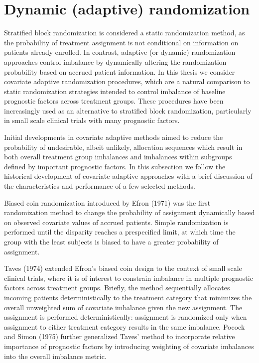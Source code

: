 \section{Dynamic (adaptive) randomization}
Stratified block randomization is considered a static randomization method, as the probability of treatment assignment is not conditional on information on patients already enrolled.  
In contrast, adaptive (or dynamic) randomization approaches control imbalance by dynamically altering the randomization probability based on accrued patient information.  
In this thesis we consider covariate adaptive randomization procedures, which are a natural comparison to static randomization strategies intended to control imbalance of baseline prognostic factors across treatment groups.  
These procedures have been increasingly used as an alternative to stratified block randomization, particularly in small scale clinical trials with many prognostic factors.

Initial developments in covariate adaptive methods aimed to reduce the probability of undesirable, albeit unlikely, allocation sequences which result in both overall treatment group imbalances and imbalances within subgroups defined by important prognostic factors.  
In this subsection we follow the historical development of covariate adaptive approaches with a brief discussion of the characteristics and performance of a few selected methods.

Biased coin randomization introduced by Efron (1971) was the first randomization method to change the probability of assignment dynamically based on observed covariate values of accrued patients. 
Simple randomization is performed until the disparity reaches a prespecified limit, at which time the group with the least subjects is biased to have a greater probability of assignment. 

Taves (1974) extended Efron’s biased coin design to the context of small scale clinical trials, where it is of interest to constrain imbalance in multiple prognostic factors across treatment groups. 
Briefly, the method sequentially allocates incoming patients deterministically to the treatment category that minimizes the overall unweighted sum of covariate imbalance given the new assignment. 
The assignment is performed deterministically: assignment is randomized only when assignment to either treatment category results in the same imbalance. 
Pocock and Simon (1975) further generalized Taves’ method to incorporate relative importance of prognostic factors by introducing weighting of covariate imbalances into the overall imbalance metric. 

